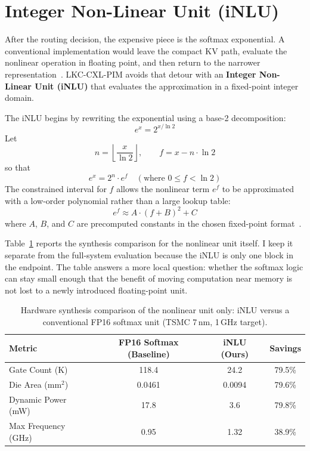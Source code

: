 \section{Integer Non-Linear Unit (iNLU)}

After the routing decision, the expensive piece is the softmax exponential. A conventional implementation would leave the compact KV path, evaluate the nonlinear operation in floating point, and then return to the narrower representation~\cite{flashattn2, newton_aim}. LKC-CXL-PIM avoids that detour with an \textbf{Integer Non-Linear Unit (iNLU)} that evaluates the approximation in a fixed-point integer domain.

The iNLU begins by rewriting the exponential using a base-2 decomposition:
\begin{equation}
e^x = 2^{x / \ln 2}
\end{equation}
Let
\begin{equation}
n = \left\lfloor \frac{x}{\ln 2} \right\rfloor, \qquad f = x - n \cdot \ln 2
\end{equation}
so that
\begin{equation}
e^x = 2^n \cdot e^f \quad (\text{where } 0 \leq f < \ln 2)
\end{equation}
The constrained interval for $f$ allows the nonlinear term $e^f$ to be approximated with a low-order polynomial rather than a large lookup table:
\begin{equation}
e^f \approx A \cdot {(f + B)}^2 + C
\end{equation}
where $A$, $B$, and $C$ are precomputed constants in the chosen fixed-point format~\cite{llm_int8}.

Table~\ref{tab:synthesis_results} reports the synthesis comparison for the nonlinear unit itself. I keep it separate from the full-system evaluation because the iNLU is only one block in the endpoint. The table answers a more local question: whether the softmax logic can stay small enough that the benefit of moving computation near memory is not lost to a newly introduced floating-point unit.

\begin{table}[htbp]
\centering
\caption[Softmax-unit synthesis comparison]{Hardware synthesis comparison of the nonlinear unit only: iNLU versus a conventional FP16 softmax unit (TSMC 7\,nm, 1\,GHz target).}
\label{tab:synthesis_results}
\begin{tabular}{lccc}
\toprule
\textbf{Metric} & \textbf{FP16 Softmax (Baseline)} & \textbf{iNLU (Ours)} & \textbf{Savings} \\
\midrule
Gate Count (K)          & 118.4  & 24.2   & 79.5\% \\
Die Area (mm$^2$)       & 0.0461 & 0.0094 & 79.6\% \\
Dynamic Power (mW)      & 17.8   & 3.6    & 79.8\% \\
Max Frequency (GHz)     & 0.95   & 1.32   & 38.9\% \\
\bottomrule
\end{tabular}
\end{table}

